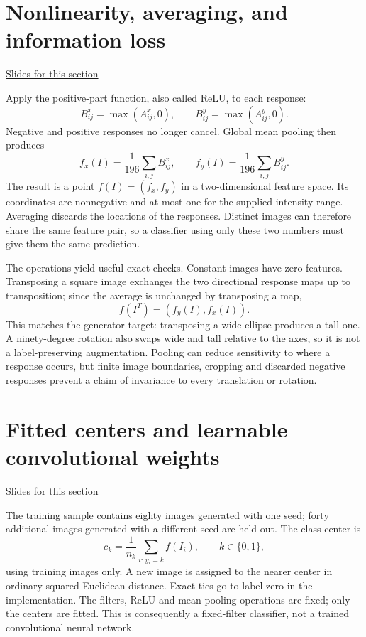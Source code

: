 \documentclass[11pt,letterpaper]{article}
\theoremstyle{definition}\newtheorem{definition}{Definition}\newtheorem{example}{Example}
\numberwithin{equation}{section}
\begin{document}
\section{Nonlinearity, averaging, and information loss}
\hypertarget{note-nonlinearity-averaging-and-information-loss}{}\label{note:nonlinearity-averaging-and-information-loss}
{\small \href{slides.html\#frame=retain-only-positive-responses\&step=1}{Slides for this section}}\par
Apply the positive-part function, also called ReLU, to each response:
\begin{equation}B^x_{ij}=\max(A^x_{ij},0),\qquad B^y_{ij}=\max(A^y_{ij},0).
\end{equation}
Negative and positive responses no longer cancel. Global mean pooling then produces
\begin{equation}f_x(I)=\frac1{196}\sum_{i,j}B^x_{ij},\qquad
f_y(I)=\frac1{196}\sum_{i,j}B^y_{ij}.\end{equation}
The result is a point $f(I)=(f_x,f_y)$ in a two-dimensional feature space. Its coordinates are nonnegative and at most one for the supplied intensity range. Averaging discards the locations of the responses. Distinct images can therefore share the same feature pair, so a classifier using only these two numbers must give them the same prediction.

The operations yield useful exact checks. Constant images have zero features. Transposing a square image exchanges the two directional response maps up to transposition; since the average is unchanged by transposing a map,
\begin{equation}f(I^T)=(f_y(I),f_x(I)).\end{equation}
This matches the generator target: transposing a wide ellipse produces a tall one. A ninety-degree rotation also swaps wide and tall relative to the axes, so it is not a label-preserving augmentation. Pooling can reduce sensitivity to where a response occurs, but finite image boundaries, cropping and discarded negative responses prevent a claim of invariance to every translation or rotation.
\section{Fitted centers and learnable convolutional weights}
\hypertarget{note-fitted-centers-and-learnable-convolutional-weights}{}\label{note:fitted-centers-and-learnable-convolutional-weights}
{\small \href{slides.html\#frame=fit-the-output-rule\&step=1}{Slides for this section}}\par
The training sample contains eighty images generated with one seed; forty additional images generated with a different seed are held out. The class center is
\begin{equation}c_k=\frac1{n_k}\sum_{i:\,y_i=k}f(I_i),\qquad k\in\{0,1\},
\end{equation}
using training images only. A new image is assigned to the nearer center in ordinary squared Euclidean distance. Exact ties go to label zero in the implementation. The filters, ReLU and mean-pooling operations are fixed; only the centers are fitted. This is consequently a fixed-filter classifier, not a trained convolutional neural network.
\end{document}
